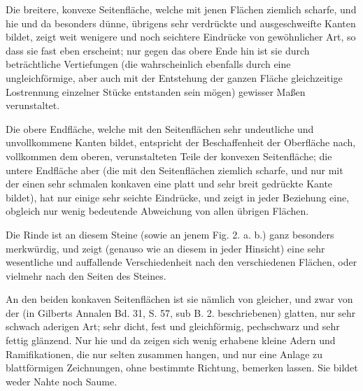 \documentclass[a4paper, 11pt, oneside, german]{article}
\begin{document}
Die breitere, konvexe Seitenfläche, welche mit jenen Flächen ziemlich scharfe, und hie und da besonders dünne, übrigens sehr verdrückte und ausgeschweifte Kanten bildet, zeigt weit wenigere und noch seichtere Eindrücke von gewöhnlicher Art, so dass sie fast eben erscheint; nur gegen das obere Ende hin ist sie durch beträchtliche Vertiefungen (die wahrscheinlich ebenfalls durch eine ungleichförmige, aber auch mit der Entstehung der ganzen Fläche gleichzeitige Lostrennung einzelner Stücke entstanden sein mögen) gewisser Maßen verunstaltet.

Die obere Endfläche, welche mit den Seitenflächen sehr undeutliche und unvollkommene Kanten bildet, entspricht der Beschaffenheit der Oberfläche nach, vollkommen dem oberen, verunstalteten Teile der konvexen Seitenfläche; die untere Endfläche aber (die mit den Seitenflächen ziemlich scharfe, und nur mit der einen sehr schmalen konkaven eine platt und sehr breit gedrückte Kante bildet), hat nur einige sehr seichte Eindrücke, und zeigt in jeder Beziehung eine, obgleich nur wenig bedeutende Abweichung von allen übrigen Flächen.

Die Rinde ist an diesem Steine (sowie an jenem Fig. 2. a. b.) ganz besonders merkwürdig, und zeigt (genauso wie an diesem in jeder Hinsicht) eine sehr wesentliche und auffallende Verschiedenheit nach den verschiedenen Flächen, oder vielmehr nach den Seiten des Steines.

An den beiden konkaven Seitenflächen ist sie nämlich von gleicher, und zwar von der (in Gilberts Annalen Bd. 31, S. 57, sub B. 2. beschriebenen) glatten, nur sehr schwach aderigen Art; sehr dicht, fest und gleichförmig, pechschwarz und sehr fettig glänzend. Nur hie und da zeigen sich wenig erhabene kleine Adern und Ramifikationen, die nur selten zusammen hangen, und nur eine Anlage zu blattförmigen Zeichnungen, ohne bestimmte Richtung, bemerken lassen. Sie bildet weder Nahte noch Saume.
\end{document}
